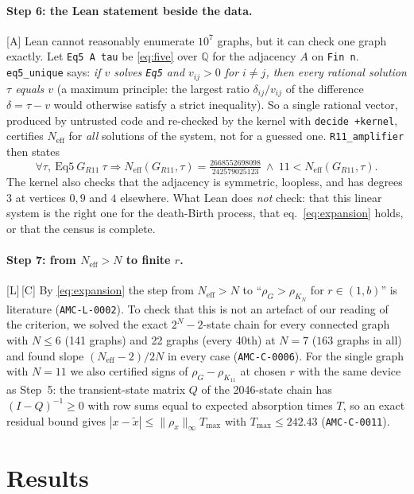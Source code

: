 \documentclass[10pt]{article}
\newcommand{\tier}[1]{\textsf{[#1]}}
\newcommand{\tA}{\tier{A}}
\newcommand{\tL}{\tier{L}}
\newcommand{\tC}{\tier{C}}
\newcommand{\lean}[1]{\texttt{#1}}
\newcommand{\Neff}{N_{\mathrm{eff}}}
\begin{document}
\paragraph{Step 6: the Lean statement beside the data.}\tA{} Lean cannot reasonably enumerate $10^7$ graphs, but it can check one graph exactly. Let \lean{Eq5 A tau} be \eqref{eq:five} over $\mathbb Q$ for the adjacency $A$ on \lean{Fin n}.
\lean{eq5\_unique} says: \emph{if $v$ solves \lean{Eq5} and $v_{ij}>0$ for $i\ne j$, then every rational solution $\tau$ equals $v$}
(a maximum principle: the largest ratio $\delta_{ij}/v_{ij}$ of the difference $\delta=\tau-v$ would otherwise satisfy a strict inequality). So a single rational vector, produced by untrusted code and
re-checked by the kernel with \lean{decide +kernel}, certifies $\Neff$ for \emph{all} solutions of the system, not for a guessed one. \lean{R11\_amplifier} then states
\[\forall\tau,\ \text{Eq5}\ G_{R11}\ \tau\Rightarrow\Neff(G_{R11},\tau)=\tfrac{2668552698098}{242579025123}\ \wedge\ 11<\Neff(G_{R11},\tau).\]
The kernel also checks that the adjacency is symmetric, loopless, and has degrees $3$ at vertices $0,9$ and $4$ elsewhere. What Lean does \emph{not} check: that this linear system is the right one for the death-Birth
process, that eq.~\eqref{eq:expansion} holds, or that the census is complete.

\paragraph{Step 7: from $\Neff>N$ to finite $r$.}\tL{}\,\tC{} By \eqref{eq:expansion} the step from $\Neff>N$ to ``$\rho_G>\rho_{K_N}$ for $r\in(1,b)$'' is literature (\texttt{AMC-L-0002}). To check that this is not an artefact of our reading of the criterion, we
solved the exact $2^N-2$-state chain for every connected graph with $N\le6$ (141 graphs) and 22 graphs (every 40th) at $N=7$ ($163$ graphs in all) and found slope $(\Neff-2)/2N$ in every case (\texttt{AMC-C-0006}). For the single graph with $N=11$ we also
certified signs of $\rho_G-\rho_{K_{11}}$ at chosen $r$ with the same device as Step~5: the transient-state matrix $Q$ of the 2046-state chain has $(I-Q)^{-1}\ge0$ with row sums equal to expected absorption times $T$, so an exact residual bound gives $|x-\tilde x|\le\|\rho_x\|_\infty T_{\max}$ with $T_{\max}\le242.43$ (\texttt{AMC-C-0011}).

\section{Results}\label{sec:results}
\end{document}
